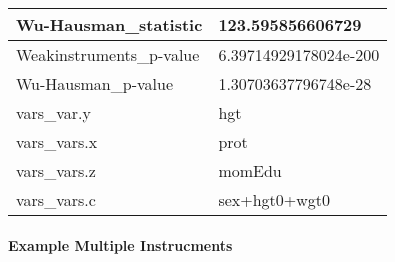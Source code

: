 \documentclass[
]{book}
\newenvironment{Shaded}{\begin{snugshade}}{\end{snugshade}}
\newcommand{\CommentTok}[1]{\textcolor[rgb]{0.56,0.35,0.01}{\textit{#1}}}
\newcommand{\DataTypeTok}[1]{\textcolor[rgb]{0.13,0.29,0.53}{#1}}
\newcommand{\KeywordTok}[1]{\textcolor[rgb]{0.13,0.29,0.53}{\textbf{#1}}}
\newcommand{\NormalTok}[1]{#1}
\newcommand{\OperatorTok}[1]{\textcolor[rgb]{0.81,0.36,0.00}{\textbf{#1}}}
\newcommand{\OtherTok}[1]{\textcolor[rgb]{0.56,0.35,0.01}{#1}}
\newcommand{\StringTok}[1]{\textcolor[rgb]{0.31,0.60,0.02}{#1}}
\begin{document}
\begin{table}[!h]
\begin{tabular}{l|l}
\hline
\rowcolor{gray!6}  Wu-Hausman\_statistic & 123.595856606729\\
\hline
Weakinstruments\_p-value & 6.39714929178024e-200\\
\hline
\rowcolor{gray!6}  Wu-Hausman\_p-value & 1.30703637796748e-28\\
\hline
vars\_var.y & hgt\\
\hline
\rowcolor{gray!6}  vars\_vars.x & prot\\
\hline
vars\_vars.z & momEdu\\
\hline
\rowcolor{gray!6}  vars\_vars.c & sex+hgt0+wgt0\\
\hline
\end{tabular}
\end{table}

\hypertarget{example-multiple-instrucments}{%
\paragraph{Example Multiple Instrucments}\label{example-multiple-instrucments}}

\begin{Shaded}
\end{Shaded}
\end{document}
